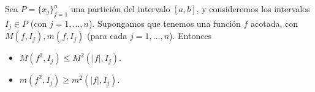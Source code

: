 \begin{lem}
    Sea $P = \{x_j\}_{j=1}^n$ una partición del intervalo $[a,b]$, y consideremos los intervalos $I_j \in P$ (con $j = 1, \dots, n$). Supongamos que tenemos una función $f$ acotada, con $M(f, I_j), m(f, I_j)$ (para cada $j = 1, \dots, n$). Entonces
    
    \begin{itemize}
        \item $M(f^2, I_j) \leq M^2(|f|, I_j)$.
        \item $m(f^2, I_j) \geq m^2(|f|, I_j)$.
    \end{itemize}
\end{lem}

